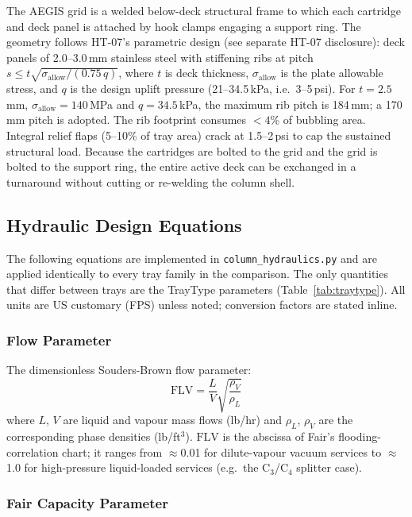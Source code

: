 \documentclass[11pt,letterpaper]{article}
\newcommand{\FLV}{\mathrm{FLV}}
\begin{document}
The AEGIS grid is a welded below-deck structural frame to which each cartridge
and deck panel is attached by hook clamps engaging a support ring.  The
geometry follows HT-07's parametric design (see separate HT-07 disclosure):
deck panels of 2.0--3.0\,mm stainless steel with stiffening ribs at pitch
$s \leq t\sqrt{\sigma_{\mathrm{allow}}/(0.75\,q)}$, where $t$ is deck
thickness, $\sigma_{\mathrm{allow}}$ is the plate allowable stress, and
$q$ is the design uplift pressure (21--34.5\,kPa, i.e.\ 3--5\,psi).  For
$t=2.5$\,mm, $\sigma_{\mathrm{allow}}=140$\,MPa and $q=34.5$\,kPa, the
maximum rib pitch is 184\,mm; a 170\,mm pitch is adopted.  The rib footprint
consumes $<4$\% of bubbling area.  Integral relief flaps (5--10\% of tray
area) crack at 1.5--2\,psi to cap the sustained structural load.  Because the
cartridges are bolted to the grid and the grid is bolted to the support ring,
the entire active deck can be exchanged in a turnaround without cutting or
re-welding the column shell.

\subsection{Hydraulic Design Equations}
\label{sec:hydraulics}

The following equations are implemented in \texttt{column\_hydraulics.py} and
are applied identically to every tray family in the comparison.
The only quantities that differ between trays are the TrayType parameters
(Table~\ref{tab:traytype}).  All units are US customary (FPS) unless noted;
conversion factors are stated inline.

\subsubsection{Flow Parameter}
\label{sec:flv}

The dimensionless Souders-Brown flow parameter:
\begin{equation}
  \FLV = \frac{L}{V}\sqrt{\frac{\rho_V}{\rho_L}}
  \label{eq:flv}
\end{equation}
where $L$, $V$ are liquid and vapour mass flows (lb/hr) and $\rho_L$,
$\rho_V$ are the corresponding phase densities (lb/ft$^3$).  $\FLV$ is the
abscissa of Fair's flooding-correlation chart; it ranges from $\approx$0.01
for dilute-vapour vacuum services to $\approx$1.0 for high-pressure
liquid-loaded services (e.g.\ the C$_3$/C$_4$ splitter case).

\subsubsection{Fair Capacity Parameter}
\label{sec:csbf}
\end{document}
